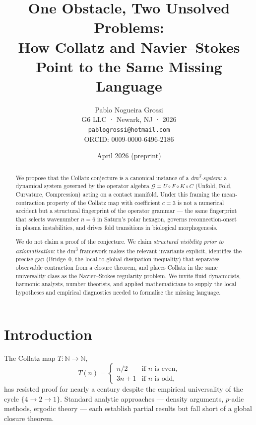 \documentclass[11pt,a4paper]{article}
\title{One Obstacle, Two Unsolved Problems:\\
How Collatz and Navier--Stokes Point to the Same Missing Language}
\author{Pablo Nogueira Grossi\\
G6 LLC · Newark, NJ · 2026\\
\texttt{pablogrossi@hotmail.com}\\
ORCID: 0009-0000-6496-2186}
\date{April 2026 (preprint)}
\begin{document}
\maketitle

\begin{abstract}
We propose that the Collatz conjecture is a canonical instance of a
\emph{dm\textsuperscript{3}-system}: a dynamical system governed by the
operator algebra $\mathcal{G} = U \circ F \circ K \circ C$ (Unfold,
Fold, Curvature, Compression) acting on a contact manifold.
Under this framing the mean-contraction property of the Collatz map
with coefficient $c = 3$ is not a numerical accident but a structural
fingerprint of the operator grammar — the same fingerprint that selects
wavenumber $n = 6$ in Saturn's polar hexagon, governs
reconnection-onset in plasma instabilities, and drives fold transitions
in biological morphogenesis.

We do not claim a proof of the conjecture.
We claim \emph{structural visibility prior to axiomatisation}: the
dm\textsuperscript{3} framework makes the relevant invariants explicit,
identifies the precise gap (Bridge~0, the local-to-global dissipation
inequality) that separates observable contraction from a closure theorem,
and places Collatz in the same universality class as the Navier--Stokes
regularity problem.
We invite fluid dynamicists, harmonic analysts, number theorists, and
applied mathematicians to supply the local hypotheses and empirical
diagnostics needed to formalise the missing language.
\end{abstract}

\tableofcontents
\bigskip

\section{Introduction}

The Collatz map $T : \mathbb{N} \to \mathbb{N}$,
\[
  T(n) = \begin{cases} n/2 & \text{if } n \text{ is even,} \\
                        3n+1 & \text{if } n \text{ is odd,}
         \end{cases}
\]
has resisted proof for nearly a century despite the empirical
universality of the cycle $\{4 \to 2 \to 1\}$.
Standard analytic approaches — density arguments, $p$-adic methods,
ergodic theory — each establish partial results but fall short of a
global closure theorem.
\end{document}
